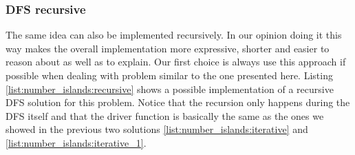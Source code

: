 

\subsubsection{DFS recursive}
\label{sec:num_island:recursive}
The same idea can also be implemented recursively. In our opinion doing it this way makes the
overall implementation more expressive, shorter and easier to reason about as well as to explain. Our first choice is always 
use this approach if possible when dealing with problem similar to the one presented here.
Listing \ref{list:number_islands:recursive} shows a possible implementation of a recursive DFS solution for
this problem. 
Notice that the recursion only happens during the DFS itself and that the driver
function  is basically the same as the ones we showed in the
previous two solutions \ref{list:number_islands:iterative} and
\ref{list:number_islands:iterative_1}.

